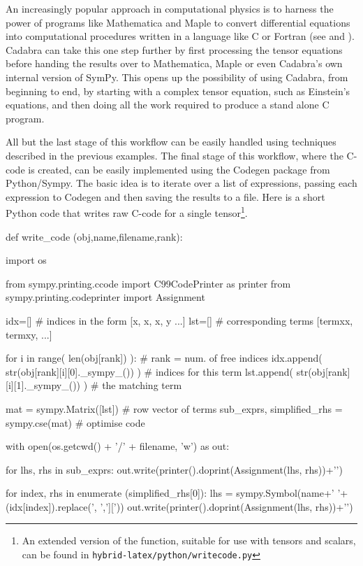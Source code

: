 \documentclass[a4paper,12pt]{article}
\numberwithin{equation}{section}%
\begin{document}
An increasingly popular approach in computational physics is to harness the power of
programs like Mathematica and Maple to convert differential equations into computational
procedures written in a language like C or Fortran (see \cite{husa:2006-01} and
\cite{ruchlin:2018-01}). Cadabra can take this one step further by first processing the
tensor equations before handing the results over to Mathematica, Maple or even Cadabra's own
internal version of SymPy. This opens up the possibility of using Cadabra, from beginning to
end, by starting with a complex tensor equation, such as Einstein's equations, and then
doing all the work required to produce a stand alone C program.

All but the last stage of this workflow can be easily handled using techniques described in
the previous examples. The final stage of this workflow, where the C-code is created, can be
easily implemented using the Codegen package from Python/Sympy. The basic idea is to iterate
over a list of expressions, passing each expression to Codegen and then saving the results
to a file. Here is a short Python code that writes raw C-code for a single
tensor\footnote{An extended version of the function, suitable for use with tensors and scalars, can be found in {\tt\footnotesize hybrid-latex/python/writecode.py}}.

\begin{cadabra}
   def write_code (obj,name,filename,rank):

      import os

      from sympy.printing.ccode import C99CodePrinter as printer
      from sympy.printing.codeprinter import Assignment

      idx=[]  # indices in the form [{x, x}, {x, y} ...]
      lst=[]  # corresponding terms [termxx, termxy, ...]

      for i in range( len(obj[rank]) ):                 # rank = num. of free indices
          idx.append( str(obj[rank][i][0]._sympy_()) )  # indices for this term
          lst.append( str(obj[rank][i][1]._sympy_()) )  # the matching term

      mat = sympy.Matrix([lst])                         # row vector of terms
      sub_exprs, simplified_rhs = sympy.cse(mat)        # optimise code

      with open(os.getcwd() + '/' + filename, 'w') as out:

         for lhs, rhs in sub_exprs:
            out.write(printer().doprint(Assignment(lhs, rhs))+'\n')

         for index, rhs in enumerate (simplified_rhs[0]):
            lhs = sympy.Symbol(name+' '+(idx[index]).replace(', ',']['))
            out.write(printer().doprint(Assignment(lhs, rhs))+'\n')
\end{cadabra}
\end{document}
